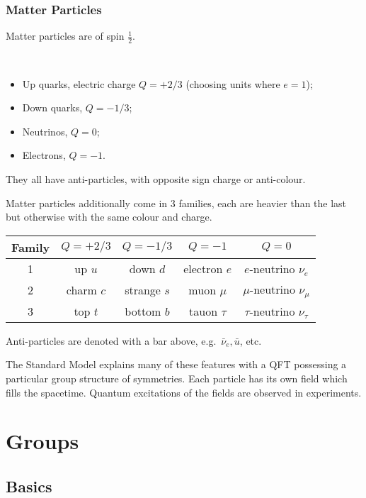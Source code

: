 \documentclass[a4paper,11pt]{article}
\begin{document}
	\subsubsection{Matter Particles} 
	Matter particles are of spin $\frac{1}{2}$.
	\begin{ex}
		\
		\begin{itemize}
			\item Up quarks, electric charge $Q = + 2/3$ (choosing units where $e = 1$);
			\item Down quarks, $Q = -1/3$; 
			\item Neutrinos, $Q = 0$;
			\item Electrons, $Q = -1$.
		\end{itemize}

		They all have anti-particles, with opposite sign charge or anti-colour.
	\end{ex}

	Matter particles additionally come in 3 families, each are heavier than the last but otherwise with the same colour and charge.

	\begin{table}[H]
		\centering
		\begin{tabular}{c|c|c|c|c}		
			\hline
			Family & $Q = + 2/3$ & $Q = - 1/3$ & $Q = -1$ & $Q = 0$ \\
			\hline
			1 & up $u$ & down $d$ & electron $e$ & $e$-neutrino $\nu_e$\\
			2 & charm $c$ & strange $s$ & muon $\mu$ & $\mu$-neutrino $\nu_\mu$\\
			3 & top $t$ & bottom $b$ & tauon $\tau$ & $\tau$-neutrino $\nu_\tau$\\
			\hline
		\end{tabular}		
	\end{table}

	Anti-particles are denoted with a bar above, e.g.\ $\bar{\nu}_e, \bar{u}$, etc.

	The Standard Model explains many of these features with a QFT possessing a particular group structure of symmetries. Each particle has its own field which fills the spacetime. Quantum excitations of the fields are observed in experiments.
	\newpage

	\section{Groups} 

	\subsection{Basics}
\end{document}
